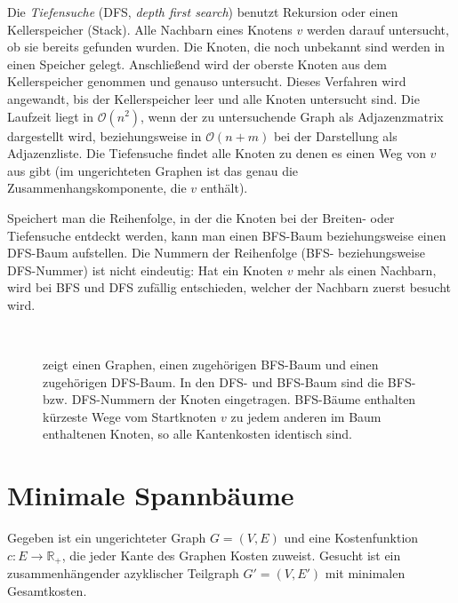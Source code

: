 Die \textit{Tiefensuche} (DFS, \textit{depth first search}) benutzt Rekursion oder einen Kellerspeicher (Stack). Alle Nachbarn eines Knotens $v$ werden darauf untersucht, ob sie bereits gefunden wurden. Die Knoten, die noch unbekannt sind werden in einen Speicher gelegt. Anschließend wird der oberste Knoten aus dem Kellerspeicher genommen und genauso untersucht. Dieses Verfahren wird angewandt, bis der Kellerspeicher leer und alle Knoten untersucht sind. Die Laufzeit liegt in $\mathcal{O}(n^2)$, wenn der zu untersuchende Graph als Adjazenzmatrix dargestellt wird, beziehungsweise in $\mathcal{O}(n+m)$ bei der Darstellung als Adjazenzliste. Die Tiefensuche findet alle Knoten zu denen es einen Weg von $v$ aus gibt (im ungerichteten Graphen ist das genau die Zusammenhangskomponente, die $v$ enthält).

Speichert man die Reihenfolge, in der die Knoten bei der Breiten- oder Tiefensuche entdeckt werden, kann man einen BFS-Baum beziehungsweise einen DFS-Baum aufstellen. Die Nummern der Reihenfolge (BFS- beziehungsweise DFS-Nummer) ist nicht eindeutig: Hat ein Knoten $v$ mehr als einen Nachbarn, wird bei BFS und DFS zufällig entschieden, welcher der Nachbarn zuerst besucht wird.

\begin{figure}[hbt]
  \centering
  \\
  \hspace{.05\textwidth}
  \caption{ zeigt einen Graphen,  einen zugehörigen BFS-Baum und  einen zugehörigen DFS-Baum. In den DFS- und BFS-Baum sind die BFS- bzw. DFS-Nummern der Knoten eingetragen. BFS-Bäume enthalten kürzeste Wege vom Startknoten $v$ zu jedem anderen im Baum enthaltenen Knoten, so alle Kantenkosten identisch sind.}
  \label{kap4BfsDfsBaeume}
\end{figure}

\section{Minimale Spannbäume}
Gegeben ist ein ungerichteter Graph $G=(V,E)$ und eine Kostenfunktion $c: E \to \mathbb{R_+}$, die jeder Kante des Graphen Kosten zuweist. Gesucht ist ein zusammenhängender azyklischer Teilgraph $G'=(V, E')$ mit minimalen Gesamtkosten.

